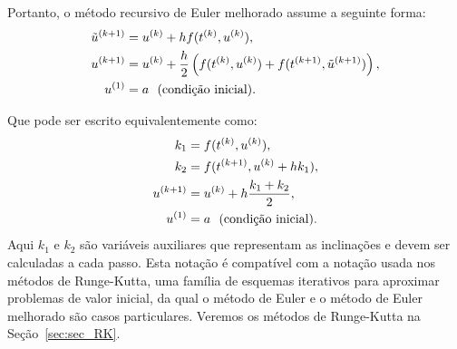 Portanto, o método recursivo de Euler melhorado assume a seguinte forma:
\begin{equation}
 \begin{split}
\tilde{u}^{(k+1)}&=u^{(k)}+h f(t^{(k)},u^{(k)}),\\
u^{(k+1)}&=u^{(k)}+\frac{h}{2}\left(f(t^{(k)},u^{(k)})+f(t^{(k+1)},\tilde{u}^{(k+1)})\right),\\
u^{(1)}&=a~~ \hbox{\text{(condição inicial)}}.
 \end{split}
\end{equation}


Que pode ser escrito equivalentemente como:
\begin{equation}
 \begin{split}
k_1&=f(t^{(k)},u^{(k)}),\\
k_2&=f(t^{(k+1)},u^{(k)}+hk_1),\\
u^{(k+1)}&=u^{(k)}+h\dfrac{k_1+k_2}{2},\\
u^{(1)}&=a~~ \hbox{\text{(condição inicial)}}.
 \end{split}
\end{equation}
Aqui $k_1$ e $k_2$ são variáveis auxiliares que representam as inclinações e devem ser calculadas a cada passo. Esta notação é compatível com a notação usada nos métodos de Runge-Kutta, uma família de esquemas iterativos para aproximar problemas de valor inicial, da qual o método de Euler e o método de Euler melhorado são casos particulares. Veremos os métodos de Runge-Kutta na Seção~\ref{sec:sec_RK}.

